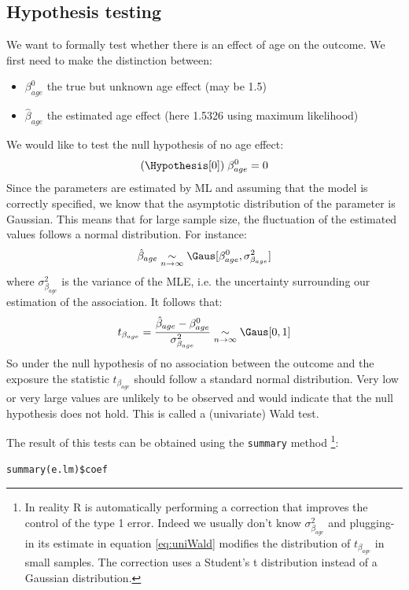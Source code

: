 \documentclass[12pt]{article}
\begin{document}
\subsection{Hypothesis testing}
\label{sec:orgd700c45}

We want to formally test whether there is an effect of age on the
outcome. We first need to make the distinction between:
\begin{itemize}
\item \(\beta^0_{age}\) the true but unknown age effect (may be 1.5)
\item \(\widehat{\beta}_{age}\) the estimated age effect (here 1.5326 using maximum likelihood)
\end{itemize}
We would like to test the null hypothesis of no age effect:
\begin{align*}
(\Hypothesis[0]) \; \beta^0_{age} = 0
\end{align*}
 Since the parameters are estimated by ML and assuming that the model
is correctly specified, we know that the asymptotic distribution of
the parameter is Gaussian. This means that for large sample size, the
fluctuation of the estimated values follows a normal distribution. For
instance:
\begin{align*}
\hat{\beta}_{age} \underset{n \rightarrow \infty}{\sim} \Gaus[\beta^0_{age},\sigma^2_{\beta_{age}}]
\end{align*}
where \(\sigma^2_{\beta_{age}}\) is the variance of the MLE, i.e. the
uncertainty surrounding our estimation of the association. It follows that:
\begin{align}
t_{\beta_{age}} = \frac{\hat{\beta}_{age}-\beta^0_{age}}{\sigma^2_{\beta_{age}}} \underset{n \rightarrow \infty}{\sim} \Gaus[0,1] \label{eq:uniWald}
\end{align}
So under the null hypothesis of no association between the outcome and
the exposure the statistic \(t_{\beta_{age}}\) should follow a standard
normal distribution. Very low or very large values are unlikely to be
observed and would indicate that the null hypothesis does not
hold. This is called a (univariate) Wald test. 

\clearpage 

The result of this tests can be obtained using the \texttt{summary}
method \footnote{In reality R is automatically performing a correction that
improves the control of the type 1 error. Indeed we usually don't know
\(\sigma^2_{\beta_{age}}\) and plugging-in its estimate in equation
\eqref{eq:uniWald} modifies the distribution of \(t_{\beta_{age}}\) in
small samples. The correction uses a Student's t distribution instead
of a Gaussian distribution.}:
\lstset{language=r,label= ,caption= ,captionpos=b,numbers=none}
\begin{lstlisting}
summary(e.lm)$coef
\end{lstlisting}
\end{document}
